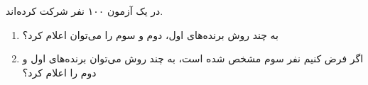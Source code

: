 \begin{problem}
    در یک آزمون ۱۰۰ نفر شرکت کرده‌اند.

    \begin{enumerate}
        \item 
        به چند روش  برنده‌های اول، دوم و سوم را می‌توان اعلام کرد؟

        \item 
        اگر فرض کنیم نفر سوم مشخص شده است، به چند روش می‌توان برنده‌های اول و دوم را اعلام کرد؟
    \end{enumerate}
\end{problem}